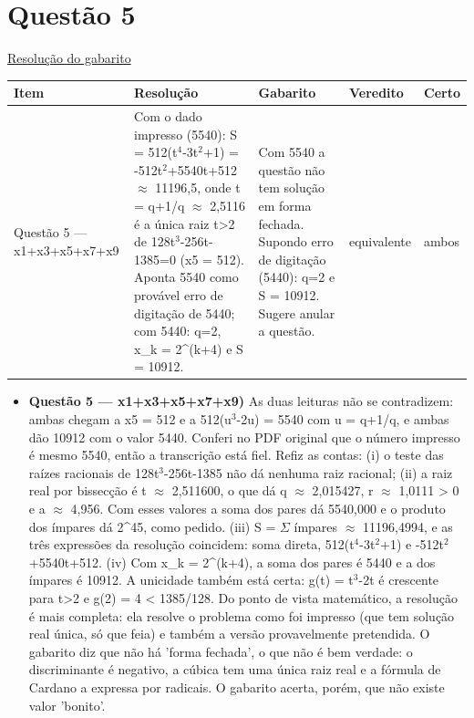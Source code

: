 \documentclass{article}%
\begin{document}
\section*{Questão 5}%
\href{https://poliedroresolve.sistemapoliedro.com.br/vestibulares/ime/2027/ime-2-fase-dia-1-26-10-2026-2-fase-dia-1/dissertativa-5-matematica-2-fase-dia-1-ime-2027}{Resolução do gabarito}\par\smallskip%
\begin{longtable}{@{}p{} p{} p{} p{} p{}@{}}\toprule Item & Resolução & Gabarito & Veredito & Certo \\ \midrule
Questão 5 --- x1+x3+x5+x7+x9 & Com o dado impresso (5540): S = 512(t$^{4}$-3t$^2$+1) = -512t$^2$+5540t+512 $\approx$ 11196,5, onde t = q+1/q $\approx$ 2,5116 é a única raiz t>2 de 128t$^3$-256t-1385=0 (x5 = 512). Aponta 5540 como provável erro de digitação de 5440; com 5440: q=2, x\_k = 2\^{}(k+4) e S = 10912. & Com 5540 a questão não tem solução em forma fechada. Supondo erro de digitação (5440): q=2 e S = 10912. Sugere anular a questão. & equivalente & ambos \\
\bottomrule\end{longtable}%
\begin{itemize}%
\item%
\textbf{Questão 5 --- x1+x3+x5+x7+x9)} As duas leituras não se contradizem: ambas chegam a x5 = 512 e a 512(u$^3$-2u) = 5540 com u = q+1/q, e ambas dão 10912 com o valor 5440. Conferi no PDF original que o número impresso é mesmo 5540, então a transcrição está fiel. Refiz as contas: (i) o teste das raízes racionais de 128t$^3$-256t-1385 não dá nenhuma raiz racional; (ii) a raiz real por bissecção é t $\approx$ 2,511600, o que dá q $\approx$ 2,015427, r $\approx$ 1,0111 > 0 e a $\approx$ 4,956. Com esses valores a soma dos pares dá 5540,000 e o produto dos ímpares dá 2\^{}45, como pedido. (iii) S = $\Sigma$ ímpares $\approx$ 11196,4994, e as três expressões da resolução coincidem: soma direta, 512(t$^{4}$-3t$^2$+1) e -512t$^2$+5540t+512. (iv) Com x\_k = 2\^{}(k+4), a soma dos pares é 5440 e a dos ímpares é 10912. A unicidade também está certa: g(t) = t$^3$-2t é crescente para t>2 e g(2) = 4 < 1385/128. Do ponto de vista matemático, a resolução é mais completa: ela resolve o problema como foi impresso (que tem solução real única, só que feia) e também a versão provavelmente pretendida. O gabarito diz que não há 'forma fechada', o que não é bem verdade: o discriminante é negativo, a cúbica tem uma única raiz real e a fórmula de Cardano a expressa por radicais. O gabarito acerta, porém, que não existe valor 'bonito'.%
\end{itemize}%
\end{document}
